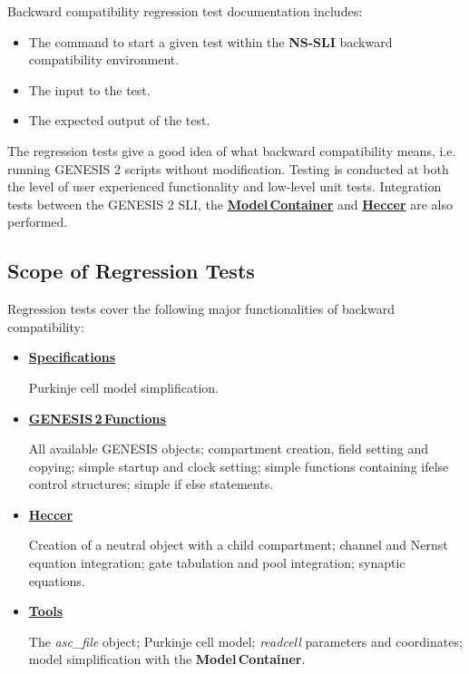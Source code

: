 \documentclass[12pt]{article}
\begin{document}
Backward compatibility regression test documentation includes:
\begin{itemize}
\item The command to start a given test within the {\bf NS-SLI} backward compatibility environment.
\item The input to the test.
\item The expected output of the test.
\end{itemize}
The regression tests give a good idea of what backward compatibility means, i.e. running GENESIS 2 scripts without modification. Testing is conducted at both the level of user experienced functionality and low-level unit tests. Integration tests between the GENESIS 2 SLI, the \href{../model-container/model-container.tex}{\bf Model\,Container} and \href{../heccer/heccer.tex}{\bf Heccer} are also performed.

\subsection*{Scope of Regression Tests}

Regression tests cover the following major functionalities of backward compatibility:
\begin{itemize}
\item[]\href{http://www.neurospaces.org/neurospaces_project/ns-sli/tests/html/specifications/main.html}{\bf Specifications}

Purkinje cell model simplification.

\item[]\href{http://www.neurospaces.org/neurospaces_project/ns-sli/tests/html/specifications/core/main.html}{\bf GENESIS\,2\,Functions}

All available GENESIS objects; compartment creation, field setting and copying; simple startup and clock setting; simple functions containing ifelse control structures; simple if else statements.

\item[]\href{http://www.neurospaces.org/neurospaces_project/ns-sli/tests/html/specifications/heccer/main.html}{\bf Heccer}

Creation of a neutral object with a child compartment; channel and Nernst equation integration; gate tabulation and pool integration; synaptic equations.

\item[]\href{http://www.neurospaces.org/neurospaces_project/ns-sli/tests/html/specifications/tools/main.html}{\bf Tools}

The {\it asc\_file} object; Purkinje cell model; {\it readcell} parameters and coordinates; model simplification with the {\bf Model\,Container}.

\end{itemize}
\end{document}
